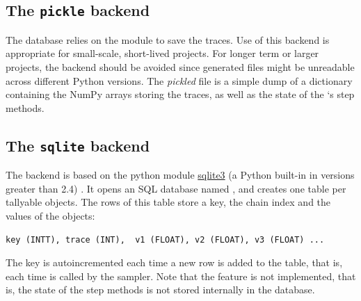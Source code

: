\documentclass[letterpaper,10pt,english]{sphinxmanual}
\begin{document}
\subsection{The \texttt{pickle} backend}
\label{database:the-pickle-backend}
The  database relies on the  module to save the traces. Use of this backend is appropriate for small-scale, short-lived projects. For longer term or larger projects, the  backend should be avoided since generated files might be unreadable across different Python versions. The \emph{pickled} file is a simple dump of a dictionary containing the NumPy arrays storing the traces, as well as the state of the `s step methods.


\subsection{The \texttt{sqlite} backend}
\label{database:the-sqlite-backend}
The  backend is based on the python module \href{http://www.sqlite.org}{sqlite3} (a Python built-in in versions greater than 2.4) . It opens an SQL database named , and creates one table per tallyable objects. The rows of this table store a key, the chain index and the values of the objects:

\begin{Verbatim}[commandchars=@\[\]]
key (INTT), trace (INT),  v1 (FLOAT), v2 (FLOAT), v3 (FLOAT) ...
\end{Verbatim}

The key is autoincremented each time a new row is added to the table, that is, each time  is called by the sampler. Note that the  feature is not implemented, that is, the state of the step methods is not stored internally in the database.
\end{document}
